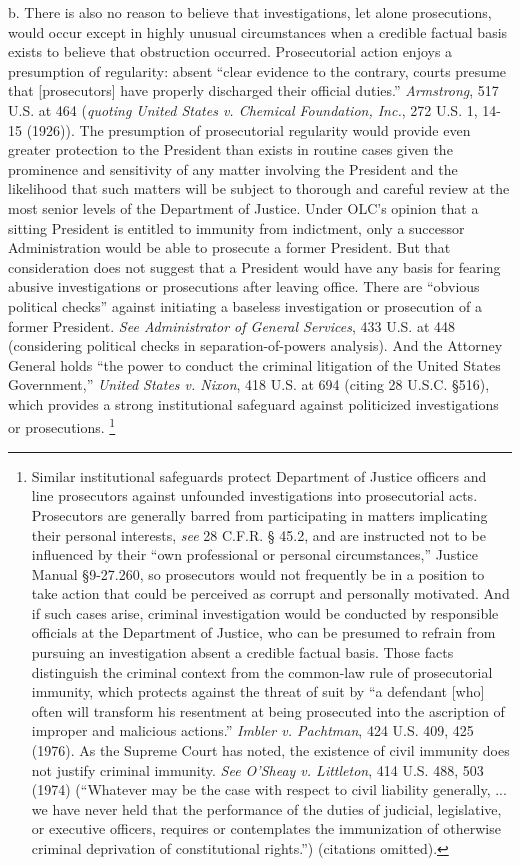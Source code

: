 b. There is also no reason to believe that investigations, let alone prosecutions, would occur except in highly unusual circumstances when a credible factual basis exists to believe that obstruction occurred.
Prosecutorial action enjoys a presumption of regularity: absent “clear evidence to the contrary, courts presume that [prosecutors] have properly discharged their official duties.”
\textit{Armstrong}, 517 U.S. at 464 (\textit{quoting United States v. Chemical Foundation, Inc.}, 272 U.S. 1, 14-15 (1926)).
The presumption of prosecutorial regularity would provide even greater protection to the President than exists in routine cases given the prominence and sensitivity of any matter involving the President and the likelihood that such matters will be subject to thorough and careful review at the most senior levels of the Department of Justice.
Under OLC’s opinion that a sitting President is entitled to immunity from indictment, only a successor Administration would be able to prosecute a former President.
But that consideration does not suggest that a President would have any basis for fearing abusive investigations or prosecutions after leaving office.
There are “obvious political checks” against initiating a baseless investigation or prosecution of a former President.
\textit{See Administrator of General Services}, 433 U.S. at 448 (considering political checks in separation-of-powers analysis).
And the Attorney General holds “the power to conduct the criminal litigation of the United States Government,” \textit{United States v. Nixon}, 418 U.S. at 694 (citing 28 U.S.C. \S 516), which provides a strong institutional safeguard against politicized investigations or prosecutions.%
\footnote{Similar institutional safeguards protect Department of Justice officers and line prosecutors against unfounded investigations into prosecutorial acts.
Prosecutors are generally barred from participating in matters implicating their personal interests, \textit{see} 28 C.F.R. § 45.2, and are instructed not to be influenced by their “own professional or personal circumstances,” Justice Manual \S 9-27.260, so prosecutors would not frequently be in a position to take action that could be perceived as corrupt and personally motivated.
And if such cases arise, criminal investigation would be conducted by responsible officials at the Department of Justice, who can be presumed to refrain from pursuing an investigation absent a credible factual basis.
Those facts distinguish the criminal context from the common-law rule of prosecutorial immunity, which protects against the threat of suit by “a defendant [who] often will transform his resentment at being prosecuted into the ascription of improper and malicious actions.”
\textit{Imbler v. Pachtman}, 424 U.S. 409, 425 (1976).
As the Supreme Court has noted, the existence of civil immunity does not justify criminal immunity.
\textit{See O'Sheay v. Littleton}, 414 U.S. 488, 503 (1974) (“Whatever may be the case with respect to civil liability generally, ... we have never held that the performance of the duties of judicial, legislative, or executive officers, requires or contemplates the immunization of otherwise criminal deprivation of constitutional rights.”) (citations omitted).}

